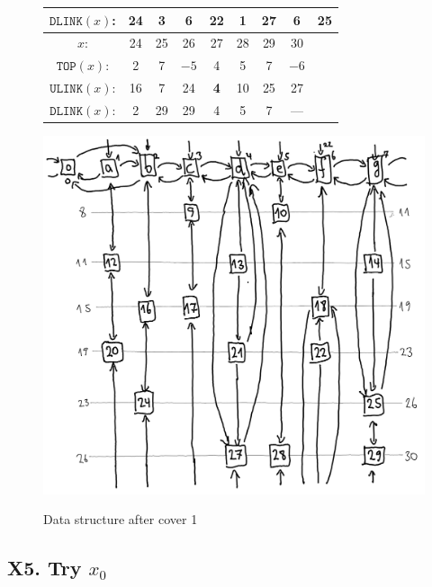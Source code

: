 \documentclass[a4paper,landscape,11pt]{article}
\begin{document}
\begin{figure}[H]
\begin{minipage}[t]{0.48\linewidth}
\begin{tabular}{c c c c c c c c c}
			$\texttt{DLINK}(x)$: & 24         & 3  & \textbf{6} & 22         & 1           & 27 & 6           & 25   \\
			\hline
			$x$:                 & 24         & 25 & 26         & 27         & 28          & 29 & 30          &      \\
			$\texttt{TOP}(x)$:   & 2          & 7  & $-5$       & 4          & 5           & 7  & $-6$        &      \\
			$\texttt{ULINK}(x)$: & 16         & 7  & 24         & \textbf{4} & 10          & 25 & 27          &      \\
			$\texttt{DLINK}(x)$: & 2          & 29 & 29         & 4          & 5           & 7  & ---         &      \\
		\end{tabular}
		\label{tab:mem_layout_after_cover_1}
	\end{minipage}
	\hfill
	\begin{minipage}[t]{0.48\linewidth}
		\centering
		\caption{Data structure after cover 1}
		\includegraphics[width=\linewidth]{vol4b_ex11_p125_2.png}
		\label{fig:data_structure_after_cover_1}
	\end{minipage}
\end{figure}

\subsection{X5. Try $x_0$}
\end{document}
